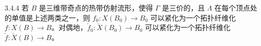 
\begin{theorem}{3.4.4}
若 $B$ 是三维带奇点的热带仿射流形，使得 $\Gamma$ 是三价的，且 $\Lambda$ 在每个顶点处的单值是上述两类之一，则 $f_0:X(B_0)\to B_0$ 可以紧化为一个拓扑纤维化 $f:X(B)\to B$。对偶地，$\check f_0:\check X(B_0)\to B_0$ 可以紧化为一个拓扑纤维化 $\check f:\check X(B)\to B$。
\end{theorem}

